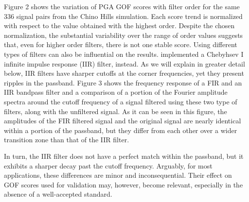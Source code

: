 Figure 2 shows the variation of PGA GOF scores with filter order for the same 336 signal pairs from the Chino Hills simulation. Each score trend is normalized with respect to the value obtained with the highest order. Despite the chosen normalization, the substantial variability over the range of order values suggests that, even for higher order filters, there is not one stable score. Using different types of filters can also be influential on the results. \citet{Khoshnevis2015} implemented a Chebyhsev I infinite impulse response (IIR) filter, instead. As we will explain in greater detail below, IIR filters have sharper cutoffs at the corner frequencies, yet they present ripples in the passband. Figure 3 shows the frequency response of a FIR and an IIR bandpass filter and a comparison of a portion of the Fourier amplitude spectra around the cutoff frequency of a signal filtered using these two type of filters, along with the unfiltered signal. As it can be seen in this figure, the amplitudes of the FIR filtered signal and the original signal are nearly identical within a portion of the passband, but they differ from each other over a wider transition zone than that of the IIR filter.

In turn, the IIR filter does not have a perfect match within the passband, but it exhibits a sharper decay past the cutoff frequency. Arguably, for most applications, these differences are minor and inconsequential. Their effect on GOF scores used for validation may, however, become relevant, especially in the absence of a well-accepted standard. 

